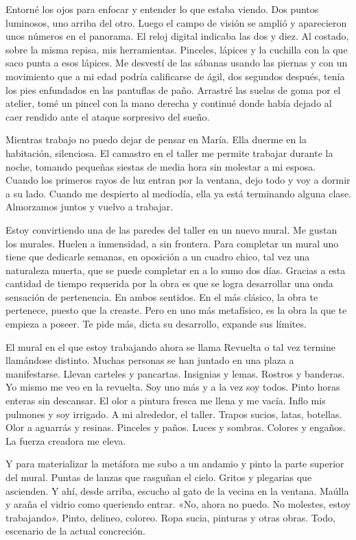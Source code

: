 \documentclass[11pt,twoside,openright,a5paper]{book}
\begin{document}
Entorné los ojos para enfocar y entender lo que estaba viendo. Dos puntos luminosos, uno arriba del otro. Luego el campo de visión se amplió y aparecieron unos números en el panorama. El reloj digital indicaba las dos y diez. Al costado, sobre la misma repisa, mis herramientas. Pinceles, lápices y la cuchilla con la que saco punta a esos lápices. Me desvestí de las sábanas usando las piernas y con un movimiento que a mi edad podría calificarse de ágil, dos segundos después, tenía los pies enfundados en las pantuflas de paño. Arrastré las suelas de goma por el atelier, tomé un pincel con la mano derecha y continué donde había dejado al caer rendido ante el ataque sorpresivo del sueño.

Mientras trabajo no puedo dejar de pensar en María. Ella duerme en la habitación, silenciosa. El camastro en el taller me permite trabajar durante la noche, tomando pequeñas siestas de media hora sin molestar a mi esposa. Cuando los primeros rayos de luz entran por la ventana, dejo todo y voy a dormir a su lado. Cuando me despierto al mediodía, ella ya está terminando alguna clase. Almorzamos juntos y vuelvo a trabajar.

Estoy convirtiendo una de las paredes del taller en un nuevo mural. Me gustan los murales. Huelen a inmensidad, a sin frontera. Para completar un mural uno tiene que dedicarle semanas, en oposición a un cuadro chico, tal vez una naturaleza muerta, que se puede completar en a lo sumo dos días. Gracias a esta cantidad de tiempo requerida por la obra es que se logra desarrollar una onda sensación de pertenencia. En ambos sentidos. En el más clásico, la obra te pertenece, puesto que la creaste. Pero en uno más metafísico, es la obra la que te empieza a poseer. Te  pide más, dicta su desarrollo, expande sus límites. 

El mural en el que estoy trabajando ahora se llama Revuelta o tal vez termine llamándose distinto. Muchas personas se han juntado en una plaza a manifestarse. Llevan carteles y pancartas. Insignias y lemas. Rostros y banderas. Yo mismo me veo en la revuelta. Soy uno más y a la vez soy todos. Pinto horas enteras sin descansar. El olor a pintura fresca me llena y me vacía. Inflo mis pulmones y soy irrigado. A mi alrededor, el taller. Trapos sucios, latas, botellas. Olor a aguarrás y resinas. Pinceles y paños. Luces y sombras. Colores y engaños. La fuerza creadora me eleva. 

Y para materializar la metáfora me subo a un andamio y pinto la parte superior del mural. Puntas de lanzas que rasguñan el cielo. Gritos y plegarias que ascienden. Y ahí, desde arriba, escucho al gato de la vecina en la ventana. Maúlla y araña el vidrio como queriendo entrar. «No, ahora no puedo. No molestes, estoy trabajando». Pinto, delineo, coloreo. Ropa sucia, pinturas y otras obras. Todo, escenario de la actual concreción. 
\end{document}
